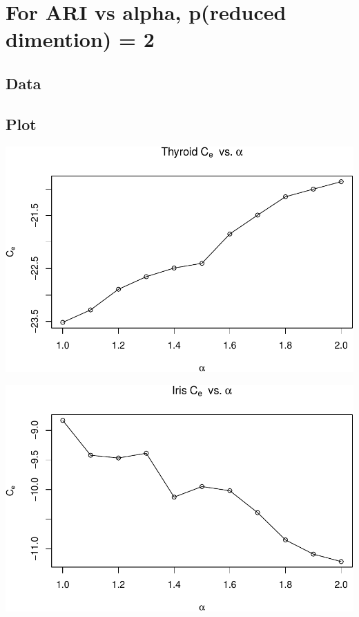 \documentclass[]{article}
\begin{document}
\section{For ARI vs alpha, p(reduced dimention) =
2}\label{for-ari-vs-alpha-preduced-dimention-2}

\subsection{Data}\label{data}

\subsection{Plot}\label{plot}

\begin{center}\includegraphics[width=1\linewidth]{Report_files/figure-latex/unnamed-chunk-20-1} \end{center}

\begin{center}\includegraphics[width=1\linewidth]{Report_files/figure-latex/unnamed-chunk-20-2} \end{center}
\end{document}
